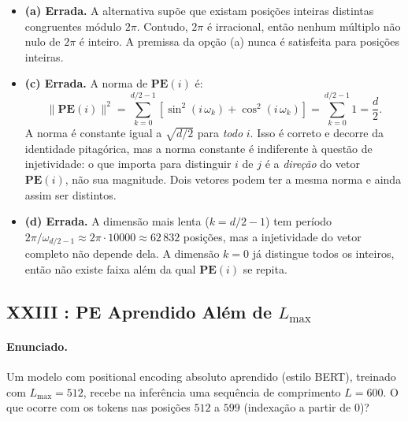 \documentclass{dlproblemset}
\begin{document}
\begin{itemize}
  \item \textbf{(a) Errada.} A alternativa supõe que existam posições inteiras
        distintas congruentes módulo $2\pi$. Contudo, $2\pi$ é irracional, então
        nenhum múltiplo não nulo de $2\pi$ é inteiro. A premissa da opção (a) nunca
        é satisfeita para posições inteiras.

  \item \textbf{(c) Errada.} A norma de $\mathbf{PE}(i)$ é:
        \[
          \|\mathbf{PE}(i)\|^2 = \sum_{k=0}^{d/2-1}
          \!\left[\sin^2\!\!\left(i\,\omega_k\right)
                + \cos^2\!\!\left(i\,\omega_k\right)\right]
          = \sum_{k=0}^{d/2-1} 1 = \frac{d}{2}.
        \]
        A norma é constante igual a $\sqrt{d/2}$ para \emph{todo} $i$. Isso é
        correto e decorre da identidade pitagórica, mas a norma constante é
        indiferente à questão de injetividade: o que importa para distinguir $i$
        de $j$ é a \emph{direção} do vetor $\mathbf{PE}(i)$, não sua magnitude.
        Dois vetores podem ter a mesma norma e ainda assim ser distintos.

  \item \textbf{(d) Errada.} A dimensão mais lenta ($k = d/2 - 1$) tem período
        $2\pi/\omega_{d/2-1} \approx 2\pi \cdot 10000 \approx 62\,832$ posições, mas
        a injetividade do vetor completo não depende dela. A dimensão $k = 0$ já
        distingue todos os inteiros, então não existe faixa além da qual
        $\mathbf{PE}(i)$ se repita.
\end{itemize}

\subsection*{XXIII {\mdseries{}}: PE Aprendido Além de $L_{\max}$}

\paragraph{Enunciado.}
Um modelo com positional encoding absoluto aprendido (estilo BERT), treinado com
$L_{\max} = 512$, recebe na inferência uma sequência de comprimento $L = 600$.
O que ocorre com os tokens nas posições $512$ a $599$ (indexação a partir de $0$)?
\end{document}
